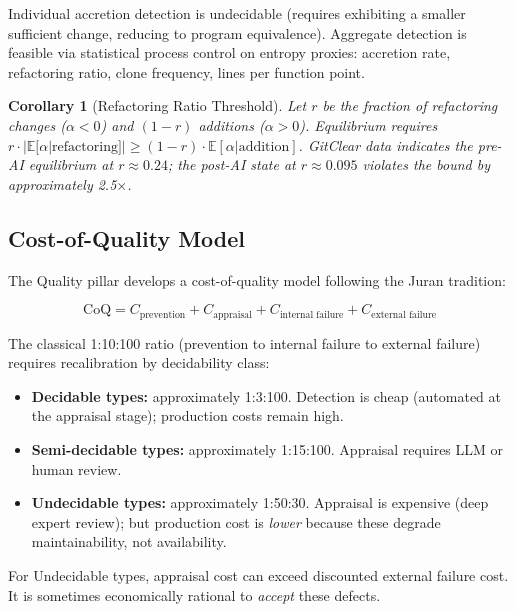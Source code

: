 \documentclass[11pt, a4paper]{googledeepmind}
\newtheorem{corollary}{Corollary}[section]
\begin{document}
Individual accretion detection is undecidable (requires exhibiting a smaller sufficient change, reducing to program equivalence). Aggregate detection is feasible via statistical process control on entropy proxies: accretion rate, refactoring ratio, clone frequency, lines per function point.

\begin{corollary}[Refactoring Ratio Threshold]
\label{cor:refactoring}
Let $r$ be the fraction of refactoring changes ($\alpha < 0$) and $(1-r)$ additions ($\alpha > 0$). Equilibrium requires $r \cdot |\mathbb{E}[\alpha | \text{refactoring}]| \geq (1-r) \cdot \mathbb{E}[\alpha | \text{addition}]$. GitClear data indicates the pre-AI equilibrium at $r \approx 0.24$; the post-AI state at $r \approx 0.095$ violates the bound by approximately 2.5$\times$.
\end{corollary}

\subsection{Cost-of-Quality Model}

The Quality pillar develops a cost-of-quality model following the Juran tradition:

\begin{equation}
    \text{CoQ} = C_{\text{prevention}} + C_{\text{appraisal}} + C_{\text{internal failure}} + C_{\text{external failure}}
\end{equation}

The classical 1:10:100 ratio (prevention to internal failure to external failure) requires recalibration by decidability class:

\begin{itemize}
\item \textbf{Decidable types:} approximately 1:3:100. Detection is cheap (automated at the appraisal stage); production costs remain high.
\item \textbf{Semi-decidable types:} approximately 1:15:100. Appraisal requires LLM or human review.
\item \textbf{Undecidable types:} approximately 1:50:30. Appraisal is expensive (deep expert review); but production cost is \emph{lower} because these degrade maintainability, not availability.
\end{itemize}

For Undecidable types, appraisal cost can exceed discounted external failure cost. It is sometimes economically rational to \emph{accept} these defects.
\end{document}
